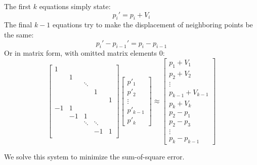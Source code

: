 The first $k$ equations simply state:
\begin{equation}
p_i' = p_i + V_i
\end{equation}
The final $k-1$ equations try to make the displacement of neighboring points be the same:
\begin{equation}
p_i' - p_{i-1}' = p_i - p_{i-1}
\end{equation}
Or in matrix form, with omitted matrix elements 0:
\[
\left[
\begin{array}{ccccc}
1 &  &  &  & \\
 & 1 &  &  &  \\
 &  & \ddots &   &  \\
 &  &  & 1 &  \\
  &  &  &  & 1 \\
-1 & 1 &   &  &  \\
 & -1 & 1 &  &  \\
 &  & \ddots & \ddots &  \\
 &  &  & -1 & 1 \\
\end{array}
\right]
\left[
\begin{array}{c}
p'_1 \\
p'_2 \\
\vdots \\
p'_{k-1} \\
p'_k
\end{array}
\right]
 \approx
\left[
\begin{array}{c}
p_1 + V_1\\
p_2 + V_2\\
\vdots \\
p_{k-1} + V_{k-1}\\
p_k + V_k\\
p_2-p_1 \\
p_2-p_3 \\
\vdots \\
p_k - p_{k-1}
\end{array}
\right]
\]

We solve this system to minimize the sum-of-square error.



